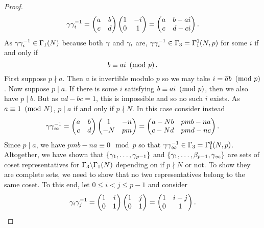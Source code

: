 \begin{proof}
        \[
          \gamma\gamma_{i}^{-1} = \begin{pmatrix} a & b \\ c & d \end{pmatrix}\begin{pmatrix} 1 & -i \\ 0 & 1 \end{pmatrix} = \begin{pmatrix} a & b-ai \\ c & d-ci \end{pmatrix}.
        \]
        As $\gamma\gamma_{i}^{-1} \in \Gamma_{1}(N)$ because both $\gamma$ and $\gamma_{i}$ are, $\gamma\gamma_{i}^{-1} \in \Gamma_{3} = \Gamma_{1}^{0}(N,p)$ for some $i$ if and only if
        \[
          b \equiv ai \ \left(\text{mod }p\right).
        \]
        First suppose $p \nmid a$. Then $a$ is invertible modulo $p$ so we may take $i = \overline{a}b \ \left(\text{mod }p\right)$. Now suppose $p \mid a$. If there is some $i$ satisfying $b \equiv ai \ \left(\text{mod }p\right)$, then we also have $p \mid b$. But as $ad-bc = 1$, this is impossible and so no such $i$ exists. As $a \equiv 1 \ \left(\text{mod }N\right)$, $p \mid a$ if and only if $p \nmid N$. In this case consider instead
        \[
          \gamma\gamma_{\infty}^{-1} = \begin{pmatrix} a & b \\ c & d \end{pmatrix}\begin{pmatrix} 1 & -n \\ -N & pm \end{pmatrix} = \begin{pmatrix} a-Nb & pmb-na \\ c-Nd & pmd-nc \end{pmatrix}.
        \]
        Since $p \mid a$, we have $pmb-na \equiv 0 \mod{p}$ so that $\gamma\gamma_{\infty}^{-1} \in \Gamma_{3} = \Gamma_{1}^{0}(N,p)$. Altogether, we have shown that $\{\gamma_{1},\ldots,\gamma_{p-1}\}$ and $\{\gamma_{1},\ldots,\beta_{p-1},\gamma_{\infty}\}$ are sets of coset representatives for $\Gamma_{3}\backslash\Gamma_{1}(N)$ depending on if $p \nmid N$ or not. To show they are complete sets, we need to show that no two representatives belong to the same coset. To this end, let $0 \le i < j \le p-1$ and consider
        \[
          \gamma_{i}\gamma_{j}^{-1} = \begin{pmatrix} 1 & i \\ 0 & 1 \end{pmatrix}\begin{pmatrix} 1 & j \\ 0 & 1 \end{pmatrix} = \begin{pmatrix} 1 & i-j \\ 0 & 1 \end{pmatrix}.
\]
\end{proof}
